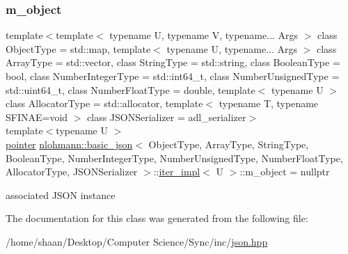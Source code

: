 \subsubsection{\texorpdfstring{m\+\_\+object}{m\_object}}
{\footnotesize\ttfamily template$<$template$<$ typename U, typename V, typename... Args $>$ class Object\+Type = std\+::map, template$<$ typename U, typename... Args $>$ class Array\+Type = std\+::vector, class String\+Type  = std\+::string, class Boolean\+Type  = bool, class Number\+Integer\+Type  = std\+::int64\+\_\+t, class Number\+Unsigned\+Type  = std\+::uint64\+\_\+t, class Number\+Float\+Type  = double, template$<$ typename U $>$ class Allocator\+Type = std\+::allocator, template$<$ typename T, typename S\+F\+I\+N\+A\+E=void $>$ class J\+S\+O\+N\+Serializer = adl\+\_\+serializer$>$ \\
template$<$typename U $>$ \\
\hyperlink{classnlohmann_1_1basic__json_1_1iter__impl_a3dddd7fa38b36e2531700ceb4a1ce9a8}{pointer} \hyperlink{classnlohmann_1_1basic__json}{nlohmann\+::basic\+\_\+json}$<$ Object\+Type, Array\+Type, String\+Type, Boolean\+Type, Number\+Integer\+Type, Number\+Unsigned\+Type, Number\+Float\+Type, Allocator\+Type, J\+S\+O\+N\+Serializer $>$\+::\hyperlink{classnlohmann_1_1basic__json_1_1iter__impl}{iter\+\_\+impl}$<$ U $>$\+::m\+\_\+object = nullptr\hspace{0.3cm}{\ttfamily [private]}}



associated J\+S\+ON instance 



The documentation for this class was generated from the following file\+:\begin{DoxyCompactItemize}
\item 
/home/shaan/\+Desktop/\+Computer Science/\+Sync/inc/\hyperlink{json_8hpp}{json.\+hpp}\end{DoxyCompactItemize}

